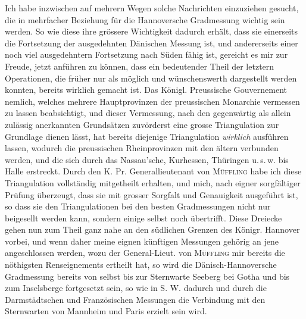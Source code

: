 \par{}%
Ich habe inzwischen auf mehrern Wegen solche Nachrichten einzuziehen gesucht, die in mehrfacher Beziehung für die Hannoversche Gradmessung wichtig sein werden. So wie diese ihre grössere Wichtigkeit dadurch erhält, dass sie einerseits die Fortsetzung der ausgedehnten Dänischen Messung ist, und andererseits einer noch viel ausgedehntern Fortsetzung nach Süden fähig ist, gereicht es mir zur Freude, jetzt anführen zu können, dass ein bedeutender Theil der letztern Operationen, die früher nur als möglich und wünschenswerth dargestellt werden konnten, bereits wirklich gemacht ist. Das Königl. Preussische Gouvernement nemlich, welches mehrere Hauptprovinzen der preussischen Monarchie vermessen zu lassen beabsichtigt, und dieser Vermessung, nach den gegenwärtig als allein zulässig anerkannten Grundsätzen zuvörderst eine grosse Triangulation zur Grundlage dienen lässt, hat bereits diejenige Triangulation \textit{wirklich} ausführen lassen, wodurch die preussischen Rheinprovinzen mit den ältern verbunden werden, und die sich durch das Nassau'sche, Kurhessen, Thüringen u.\,s.\,w. bis Halle erstreckt. Durch den K. Pr. Generallieutenant von \textsc{Müffling} habe ich diese Triangulation vollständig mitgetheilt erhalten, und mich, nach eigner sorgfältiger Prüfung überzeugt, dass sie mit grosser Sorgfalt und Genauigkeit ausgeführt ist, so dass sie den Triangulationen bei den besten Gradmessungen nicht nur beigesellt werden kann, sondern einige selbst noch übertrifft. Diese Dreiecke gehen nun zum Theil ganz nahe an den südlichen Grenzen des Königr. Hannover vorbei, und wenn daher meine eignen künftigen Messungen gehörig an jene angeschlossen werden, wozu der General-Lieut. von \textsc{Müffling} mir bereits die nöthigsten Renseignements ertheilt hat, so wird die Dänisch-Hannoversche Gradmessung bereits von selbst bis zur Sternwarte Seeberg bei Gotha und bis zum Inselsberge fortgesetzt sein, so wie in S. W. dadurch und durch die Darmstädtschen und Französischen Messungen die Verbindung mit den Sternwarten von Mannheim und Paris erzielt sein wird.

